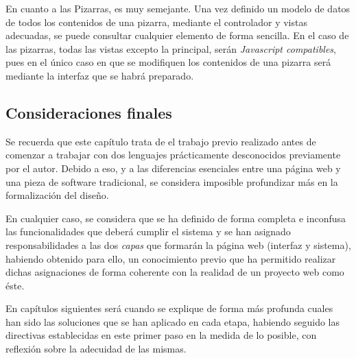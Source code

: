 En cuanto a las Pizarras, es muy semejante. Una vez definido un modelo de datos de todos los contenidos de una pizarra,  mediante el controlador y vistas adecuadas, se puede consultar cualquier elemento de forma sencilla. En el caso de las pizarras, todas las vistas excepto la principal, serán \emph{Javascript compatibles}, pues en el único caso en que se modifiquen los contenidos de una pizarra será mediante la interfaz que se habrá preparado.

\subsection{Consideraciones finales}
Se recuerda que este capítulo trata de el trabajo previo realizado antes de comenzar a trabajar con dos lenguajes prácticamente desconocidos previamente por el autor. Debido a eso, y a las diferencias esenciales entre una página web y una pieza de software tradicional, se considera imposible profundizar más en la formalización del diseño.

En cualquier caso, se considera que se ha definido de forma completa e inconfusa las funcionalidades que deberá cumplir el sistema y se han asignado responsabilidades a las dos \emph{capas} que formarán la página web (interfaz y sistema), habiendo obtenido para ello, un conocimiento previo que ha permitido realizar dichas asignaciones de forma coherente con la realidad de un proyecto web como éste.

En capítulos siguientes será cuando se explique de forma más profunda cuales han sido las soluciones que se han aplicado en cada etapa, habiendo seguido las directivas establecidas en este primer paso en la medida de lo posible, con reflexión sobre la adecuidad de las mismas. 










